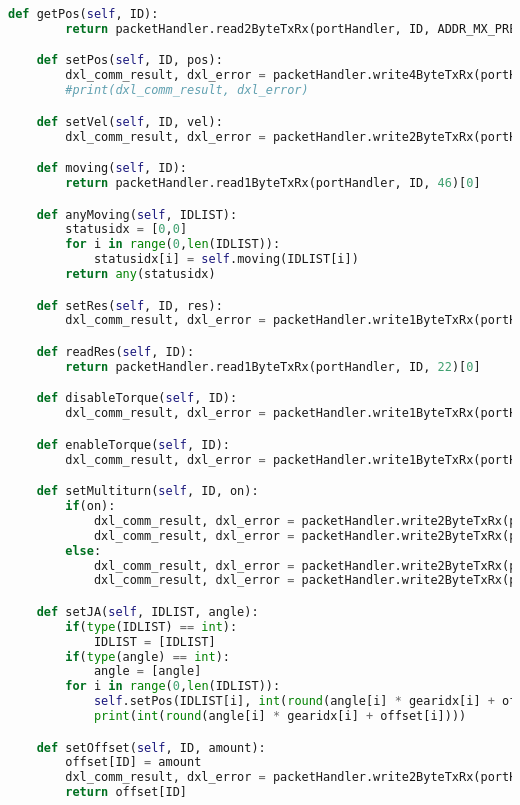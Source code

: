 \begin{lstlisting}[frame=lines,language=Python, caption=meiosis\_servo.py]
    def getPos(self, ID):
        return packetHandler.read2ByteTxRx(portHandler, ID, ADDR_MX_PRESENT_POSITION)[0]

    def setPos(self, ID, pos):
        dxl_comm_result, dxl_error = packetHandler.write4ByteTxRx(portHandler, ID, ADDR_MX_GOAL_POSITION, pos)
        #print(dxl_comm_result, dxl_error)

    def setVel(self, ID, vel):
        dxl_comm_result, dxl_error = packetHandler.write2ByteTxRx(portHandler, ID, 32, vel)

    def moving(self, ID):
        return packetHandler.read1ByteTxRx(portHandler, ID, 46)[0]

    def anyMoving(self, IDLIST):
        statusidx = [0,0]
        for i in range(0,len(IDLIST)):
            statusidx[i] = self.moving(IDLIST[i])
        return any(statusidx)

    def setRes(self, ID, res):
        dxl_comm_result, dxl_error = packetHandler.write1ByteTxRx(portHandler, ID, 22, res)

    def readRes(self, ID):
        return packetHandler.read1ByteTxRx(portHandler, ID, 22)[0]

    def disableTorque(self, ID):
        dxl_comm_result, dxl_error = packetHandler.write1ByteTxRx(portHandler, ID, ADDR_MX_TORQUE_ENABLE, 0)

    def enableTorque(self, ID):
        dxl_comm_result, dxl_error = packetHandler.write1ByteTxRx(portHandler, ID, ADDR_MX_TORQUE_ENABLE, 1)

    def setMultiturn(self, ID, on):
        if(on):
            dxl_comm_result, dxl_error = packetHandler.write2ByteTxRx(portHandler, ID, 6, 4095)
            dxl_comm_result, dxl_error = packetHandler.write2ByteTxRx(portHandler, ID, 8, 4095)
        else:
            dxl_comm_result, dxl_error = packetHandler.write2ByteTxRx(portHandler, ID, 6, 0)
            dxl_comm_result, dxl_error = packetHandler.write2ByteTxRx(portHandler, ID, 8, 4095)

    def setJA(self, IDLIST, angle):
        if(type(IDLIST) == int):
            IDLIST = [IDLIST]
        if(type(angle) == int):
            angle = [angle]
        for i in range(0,len(IDLIST)):
            self.setPos(IDLIST[i], int(round(angle[i] * gearidx[i] + offset[i])))
            print(int(round(angle[i] * gearidx[i] + offset[i])))

    def setOffset(self, ID, amount):
        offset[ID] = amount
        dxl_comm_result, dxl_error = packetHandler.write2ByteTxRx(portHandler, ID, 20, amount)
        return offset[ID]
\end{lstlisting}
\vspace{10ex}

